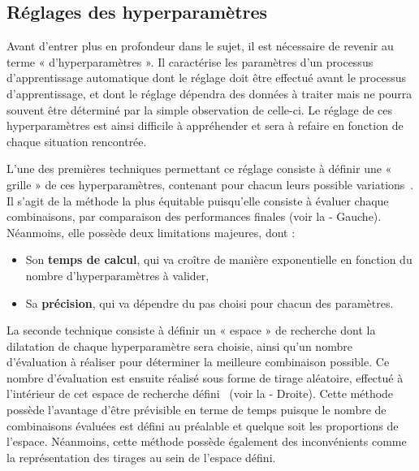 \subsection{Réglages des hyperparamètres}
\label{subsec:hyperparameter}
Avant d’entrer plus en profondeur dans le sujet, il est nécessaire de revenir au terme « d’hyperparamètres ». Il caractérise les paramètres d'un processus d'apprentissage automatique dont le réglage doit être effectué avant le processus d’apprentissage, et dont le réglage dépendra des données à traiter mais ne pourra souvent être déterminé par la simple observation de celle-ci. Le réglage de ces hyperparamètres est ainsi difficile à appréhender et sera à refaire en fonction de chaque situation rencontrée.\par

L’une des premières techniques permettant ce réglage consiste à définir une « grille » de ces hyperparamètres, contenant pour chacun leurs possible variations~\cite{Liu2006}. Il s'agit de la méthode la plus équitable puisqu'elle consiste à évaluer chaque combinaisons, par comparaison des performances finales (voir la  - Gauche). Néanmoins, elle possède deux limitations majeures, dont :
\begin{itemize}
    \item Son \textbf{temps de calcul}, qui va croître de manière exponentielle en fonction du nombre d'hyperparamètres à valider,
    \item Sa \textbf{précision}, qui va dépendre du pas choisi pour chacun des paramètres.
\end{itemize}\par

La seconde technique consiste à définir un « espace » de recherche dont la dilatation de chaque hyperparamètre sera choisie, ainsi qu'un nombre d'évaluation à réaliser pour déterminer la meilleure combinaison possible. Ce nombre d'évaluation est ensuite réalisé sous forme de tirage aléatoire, effectué à l'intérieur de cet espace de recherche défini~\cite{bergstra2012} (voir la  - Droite). Cette méthode possède l'avantage d'être prévisible en terme de temps puisque le nombre de combinaisons évaluées est défini au préalable et quelque soit les proportions de l'espace. Néanmoins, cette méthode possède également des inconvénients comme la représentation des tirages au sein de l'espace défini.

